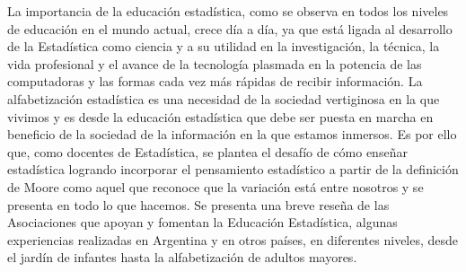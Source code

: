 \noindent La importancia de la educación estadística, como se observa en todos los niveles de educación en el mundo actual, crece día a día, ya que está ligada al desarrollo de la Estadística como ciencia y a su utilidad en la investigación, la técnica, la vida profesional y el avance de la tecnología plasmada en la potencia de las computadoras y las formas cada vez más rápidas de recibir información. La alfabetización estadística es una necesidad de la sociedad vertiginosa en la que vivimos y es desde la educación estadística que debe ser puesta en marcha en beneficio de la sociedad de la información en la que estamos inmersos. Es por ello que, como docentes de Estadística, se plantea el desafío de cómo enseñar estadística logrando incorporar el pensamiento estadístico a partir de la definición de Moore como aquel que reconoce que la variación está entre nosotros y se presenta en todo lo que hacemos. Se presenta una breve reseña de las Asociaciones que apoyan y fomentan la Educación Estadística, algunas experiencias realizadas en Argentina y en otros países, en diferentes niveles, desde el jardín de infantes hasta la alfabetización de adultos mayores. 

